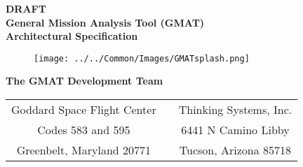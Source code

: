 \thispagestyle{empty}
\begin{center}
{\renewcommand{\thefootnote}{\fnsymbol{footnote}} { \huge \bf DRAFT
\\General Mission Analysis Tool (GMAT)\\ Architectural Specification\\}
\vspace{0.1in} }
\end{center}

\begin{figure}[htbp!]
    \begin{center}
    \texttt{[image: ../../Common/Images/GMATsplash.png]}
    \end{center}
\end{figure}

\begin{center}
{\Large \bf The GMAT Development Team}\\
\vspace{0.1in}
\begin{tabular}{c c c}
  Goddard Space Flight Center & & Thinking Systems, Inc. \\
  Codes 583 and 595 & \hspace{0.3in} & 6441 N Camino Libby \\
  Greenbelt, Maryland 20771 & & Tucson, Arizona 85718 \\
\end{tabular}

\vspace{0.1in}{\today}

\end{center}

\clearpage \clearpage

